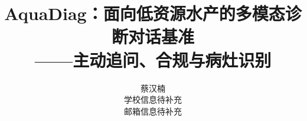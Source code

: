 \documentclass[10pt,twocolumn,letterpaper]{article}
\title{AquaDiag：面向低资源水产的多模态诊断对话基准\\——主动追问、合规与病灶识别}
\author{
蔡汉楠\\
学校信息待补充\\
{\small 邮箱信息待补充}
}
\begin{document}
\maketitle








{
    \small
    
    
}
\end{document}
